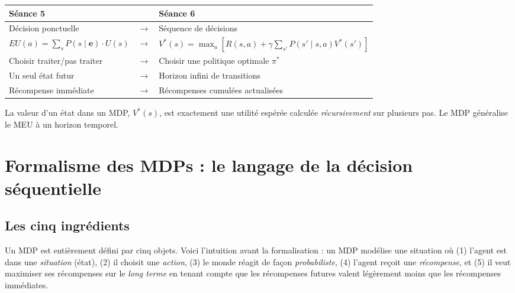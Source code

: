 \documentclass[11pt,a4paper]{article}
\begin{document}
\begin{pontbox}
\begin{center}
\renewcommand{\arraystretch}{1.6}
\begin{tabular}{lcl}
\textbf{Séance 5} & & \textbf{Séance 6} \\
\hline
Décision ponctuelle & $\longrightarrow$ & Séquence de décisions \\
$EU(a) = \sum_s P(s \mid \mathbf{e}) \cdot U(s)$ & $\longrightarrow$ & $V^*(s) = \max_a \!\left[R(s,a) + \gamma \sum_{s'} P(s' \mid s,a) V^*(s')\right]$ \\
Choisir traiter/pas traiter & $\longrightarrow$ & Choisir une politique optimale $\pi^*$ \\
Un seul état futur & $\longrightarrow$ & Horizon infini de transitions \\
Récompense immédiate & $\longrightarrow$ & Récompenses cumulées actualisées \\
\end{tabular}
\end{center}
La valeur d'un état dans un MDP, $V^*(s)$, est exactement une utilité espérée calculée \textit{récursivement} sur plusieurs pas. Le MDP généralise le MEU à un horizon temporel.
\end{pontbox}

\section{Formalisme des MDPs : le langage de la décision séquentielle}

\subsection{Les cinq ingrédients}

Un MDP est entièrement défini par cinq objets. Voici l'intuition avant la formalisation : un MDP modélise une situation où (1) l'agent est dans une \textit{situation} (état), (2) il choisit une \textit{action}, (3) le monde réagit de façon \textit{probabiliste}, (4) l'agent reçoit une \textit{récompense}, et (5) il veut maximiser ses récompenses sur le \textit{long terme} en tenant compte que les récompenses futures valent légèrement moins que les récompenses immédiates.
\end{document}
